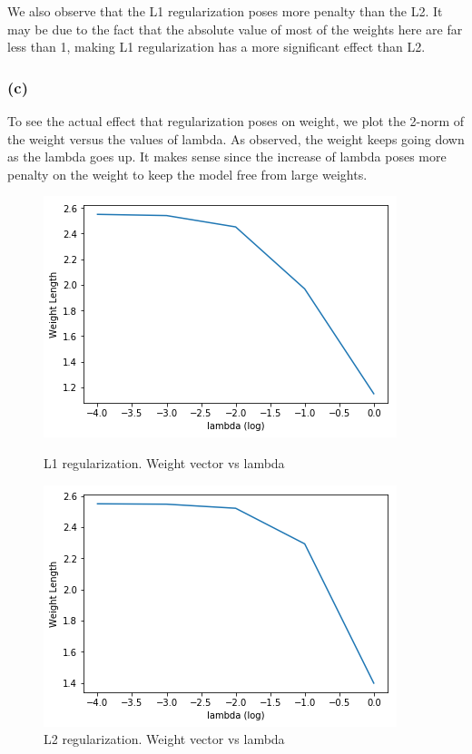\documentclass{article}
\begin{document}
We also observe that the L1 regularization poses more penalty than the L2. It may be due to the fact that the absolute value of most of the weights here are far less than 1, making L1 regularization has a more significant effect than L2.
\subsubsection*{(c)}
To see the actual effect that regularization poses on weight, we plot the 2-norm of the weight versus the values of lambda. As observed, the weight keeps going down as the lambda goes up. It makes sense since the increase of lambda poses more penalty on the weight to keep the model free from large weights. 

\begin{figure}[h]
	\begin{minipage}{0.48\textwidth}
		\centering
		\includegraphics[width=\textwidth]{weight_1.png}
		\caption{L1 regularization. Weight vector vs lambda}
	\end{minipage}\hfill
	\begin {minipage}{0.48\textwidth}
	\centering
		\includegraphics[width=\textwidth]{weight_2.png}
		\caption{L2 regularization.  Weight vector vs lambda}
\end{minipage}
\end{figure}
\end{document}
